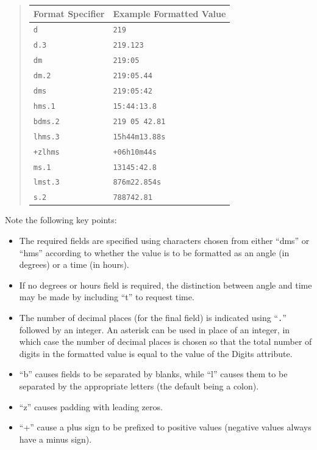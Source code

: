 \documentclass[twoside,11pt]{article}
\begin{document}
\begin{quote}
\begin{center}
\begin{tabular}{|l|l|}
\hline
{\bf{Format Specifier}} & {\bf{Example Formatted Value}}\\
\hline \hline
{\tt{d}} & {\tt{219}}\\
{\tt{d.3}} & {\tt{219.123}}\\
{\tt{dm}} & {\tt{219:05}}\\
{\tt{dm.2}} & {\tt{219:05.44}}\\
{\tt{dms}} & {\tt{219:05:42}}\\
{\tt{hms.1}} & {\tt{15:44:13.8}}\\
{\tt{bdms.2}} & {\tt{219 05 42.81}}\\
{\tt{lhms.3}} & {\tt{15h44m13.88s}}\\
{\tt{+zlhms}} & {\tt{+06h10m44s}}\\
{\tt{ms.1}} & {\tt{13145:42.8}}\\
{\tt{lmst.3}} & {\tt{876m22.854s}}\\
{\tt{s.2}} & {\tt{788742.81}}\\
\hline
\end{tabular}
\end{center}
\end{quote}

Note the following key points:

\begin{itemize}
\item The required fields are specified using characters chosen from
either ``dms'' or ``hms'' according to whether the value is to be
formatted as an angle (in degrees) or a time (in hours).

\item If no degrees or hours field is required, the distinction
between angle and time may be made by including ``t'' to request time.

\item The number of decimal places (for the final field) is indicated
using ``{\tt{.}}'' followed by an integer. An asterisk can be used in
place of an integer, in which case the number of decimal places is
chosen so that the total number of digits in the formatted value is equal
to the value of the Digits attribute.

\item ``b'' causes fields to be separated by blanks, while ``l''
causes them to be separated by the appropriate letters (the default
being a colon).

\item ``z'' causes padding with leading zeros.

\item ``+'' cause a plus sign to be prefixed to positive values
(negative values always have a minus sign).
\end{itemize}
\end{document}

